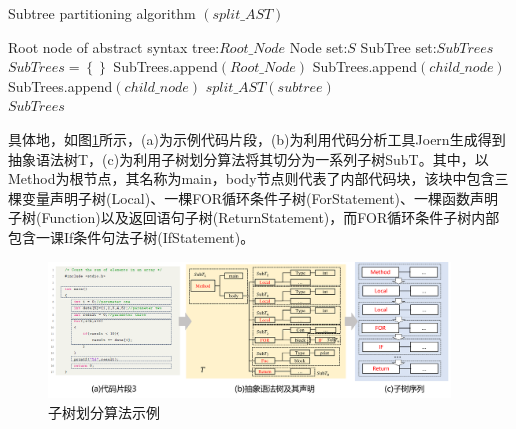 \begin{algorithm}[ht]  
	\renewcommand{\algorithmicrequire}{\textbf{Input:}}
	\renewcommand{\algorithmicensure}{\textbf{Output:}}
	\caption{Subtree partitioning algorithm $\left(split\_AST\right)$}  
	\label{alg2}
	\begin{algorithmic}[1]
    \Require Root node of abstract syntax tree:$Root\_Node$
    \Require Node set:$S$
		\Ensure SubTree set:$SubTrees$
    \State $SubTrees = \left\{\right\} $    
    \State SubTrees.append$\left(Root\_Node\right)$
       
        \State SubTrees.append$\left(child\_node\right)$
      \Else
         
            \State SubTrees.append$\left(child\_node\right)$
          \Else
            \State $ split\_AST\left(subtree\right)$ 
          \EndIf
        \EndFor
      \EndIf
    \EndFor \\
    \Return $SubTrees$
	\end{algorithmic}
\end{algorithm}

具体地，如图\ref{fig:astshili}所示，(a)为示例代码片段，(b)为利用代码分析工具Joern生成得到抽象语法树T，(c)为利用子树划分算法将其切分为一系列子树SubT。其中，以Method为根节点，其名称为main，body节点则代表了内部代码块，该块中包含三棵变量声明子树(Local)、一棵FOR循环条件子树(ForStatement)、一棵函数声明子树(Function)以及返回语句子树(ReturnStatement)，而FOR循环条件子树内部包含一课If条件句法子树(IfStatement)。

\begin{figure}[H]
  \centering
  \includegraphics[width=0.95\textwidth]{figures/astshili.png}
  \caption{子树划分算法示例}\label{fig:astshili}
\end{figure}

    
